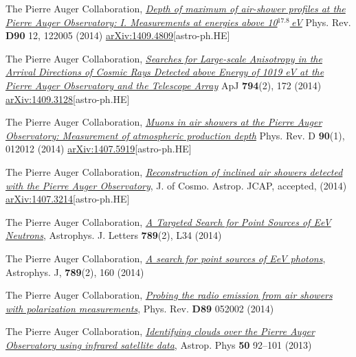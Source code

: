 \begin{etaremune}
\item {}The Pierre Auger Collaboration, \href{http://dx.doi.org/10.1103/PhysRevD.90.122005}{\emph{Depth of maximum of air-shower profiles at the Pierre Auger Observatory: I. Measurements at energies above 10$^{17.8}$\,eV}} Phys. Rev. {\bf{D90}} 12, 122005 (2014) \href{http://arxiv.org/abs/1409.4809}{arXiv:1409.4809}[astro-ph.HE]

\item {}The Pierre Auger Collaboration, \href{http://dx.doi.org/10.1088/0004-637X/794/2/172}{\emph{Searches for Large-scale Anisotropy in the Arrival Directions of Cosmic Rays Detected above Energy of 1019 eV at the Pierre Auger Observatory and the Telescope Array}} ApJ {\bf{794}}(2), 172 (2014) \href{http://arxiv.org/abs/1409.3128}{arXiv:1409.3128}[astro-ph.HE]

\item {}The Pierre Auger Collaboration, \href{http://journals.aps.org/prd/abstract/10.1103/PhysRevD.90.012012}{\emph{Muons in air showers at the Pierre Auger Observatory: Measurement of atmospheric production depth}} Phys. Rev. D {\bf{90}}(1), 012012 (2014) \href{http://arxiv.org/abs/1407.5919}{arXiv:1407.5919}[astro-ph.HE]

\item {}The Pierre Auger Collaboration, \href{http://arxiv.org/abs/1407.3214}{\emph{Reconstruction of inclined air showers detected with the Pierre Auger Observatory}}, J. of Cosmo. Astrop. JCAP, accepted, (2014) \href{http://arxiv.org/abs/1407.3214}{arXiv:1407.3214}[astro-ph.HE]
  
\item {}The Pierre Auger Collaboration, \href{http://iopscience.iop.org/2041-8205/789/2/L34}{\emph{A Targeted Search for Point Sources of EeV Neutrons}}, Astrophys. J. Letters {\bf{789}}(2), L34 (2014)

\item {}The Pierre Auger Collaboration, \href{http://iopscience.iop.org/0004-637X/789/2/160}{\emph{A search for point sources of EeV photons}}, Astrophys. J, {\bf{789}}(2), 160 (2014)

\item {}The Pierre Auger Collaboration, \href{http://dx.doi.org/10.1103/PhysRevD.89.052002}{\emph{Probing the radio emission from air showers with polarization measurements}}, Phys. Rev. {\bf{D89}} 052002 (2014)

\item {}The Pierre Auger Collaboration, \href{http://dx.doi.org/10.1016/j.astropartphys.2013.09.004}{\emph{Identifying clouds over the Pierre Auger Observatory using infrared satellite data}}, Astrop. Phys {\bf{50}} 92--101 (2013)


\end{etaremune}
